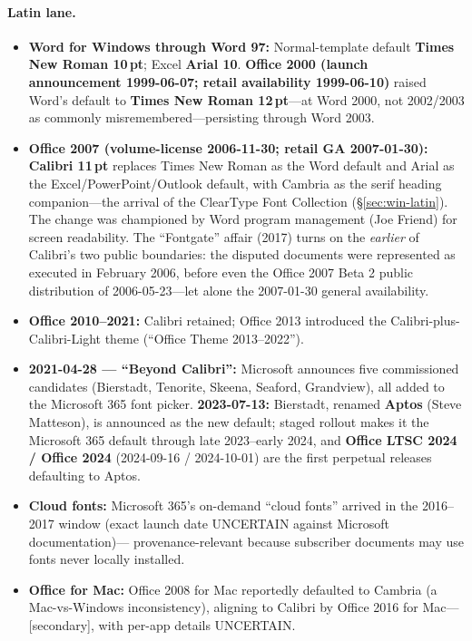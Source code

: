 \documentclass[10pt,a4paper]{article}
\begin{document}
\paragraph{Latin lane.}
\begin{itemize}[leftmargin=1.2em,itemsep=2pt]
\item \textbf{Word for Windows through Word 97:} Normal-template default \textbf{Times
New Roman 10\,pt}; Excel \textbf{Arial 10}. \textbf{Office 2000 (launch announcement
1999-06-07; retail availability 1999-06-10)} raised
Word's default to \textbf{Times New Roman 12\,pt}---at Word 2000, not 2002/2003 as
commonly misremembered---persisting through Word 2003.\cite{o-barnhill,o-barnhill-2}
\item \textbf{Office 2007 (volume-license 2006-11-30; retail GA 2007-01-30):}
\textbf{Calibri 11\,pt} replaces Times New Roman as the Word default and Arial as the
Excel/PowerPoint/Outlook default, with Cambria as the serif heading companion---the
arrival of the ClearType Font Collection (\S\ref{sec:win-latin}). The change was
championed by Word program management (Joe Friend) for screen readability. The
``Fontgate'' affair (2017) turns on the \emph{earlier} of Calibri's two public
boundaries: the disputed documents were represented as executed in February 2006,
before even the Office 2007 Beta 2 public distribution of 2006-05-23---let alone the
2007-01-30 general availability.\cite{w-calibri,o-friend,o-fontgate}
\item \textbf{Office 2010--2021:} Calibri retained; Office 2013 introduced the
Calibri-plus-Calibri-Light theme (``Office Theme 2013--2022'').\cite{o-theme}
\item \textbf{2021-04-28 --- ``Beyond Calibri'':} Microsoft announces five commissioned
candidates (Bierstadt, Tenorite, Skeena, Seaford, Grandview), all added to the
Microsoft 365 font picker. \textbf{2023-07-13:} Bierstadt, renamed \textbf{Aptos}
(Steve Matteson), is announced as the new default; staged rollout makes it the
Microsoft 365 default through late 2023--early 2024, and \textbf{Office LTSC 2024 /
Office 2024} (2024-09-16 / 2024-10-01) are the first perpetual releases defaulting to
Aptos.\cite{o-beyond,w-aptos,w-aptos-2,o-2024}
\item \textbf{Cloud fonts:} Microsoft 365's on-demand ``cloud fonts'' arrived in the
2016--2017 window (exact launch date UNCERTAIN against Microsoft documentation)---
provenance-relevant because subscriber documents may use fonts never locally
installed.\cite{o-cloud}
\item \textbf{Office for Mac:} Office 2008 for Mac reportedly defaulted to Cambria (a
Mac-vs-Windows inconsistency), aligning to Calibri by Office 2016 for Mac---[secondary],
with per-app details UNCERTAIN.\cite{o-mac}
\end{itemize}
\end{document}
